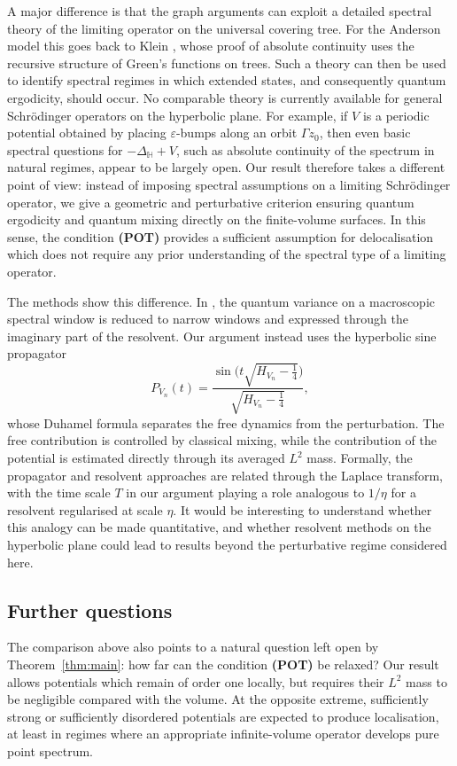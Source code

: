 \documentclass[11pt,twoside,reqno]{amsart}
\newcommand{\1}{\mathrm{\mathbf{1}}}
\numberwithin{equation}{section}
\theoremstyle{plain}
\theoremstyle{definition}
\theoremstyle{remark}
\begin{document}
A major difference is that the graph arguments can exploit a detailed spectral theory of the limiting operator on the universal covering tree. For the Anderson model this goes back to Klein \cite{Klein1998}, whose proof of absolute continuity uses the recursive structure of Green's functions on trees. Such a theory can then be used to identify spectral regimes in which extended states, and consequently quantum ergodicity, should occur. No comparable theory is currently available for general Schr\"odinger operators on the hyperbolic plane. For example, if $V$ is a periodic potential obtained by placing $\varepsilon$-bumps along an orbit $\Gamma z_0$, then even basic spectral questions for $-\Delta_{\mathbb H}+V$, such as absolute continuity of the spectrum in natural regimes, appear to be largely open. Our result therefore takes a different point of view: instead of imposing spectral assumptions on a limiting Schr\"odinger operator, we give a geometric and perturbative criterion ensuring quantum ergodicity and quantum mixing directly on the finite-volume surfaces. In this sense, the condition \textbf{(POT)} provides a sufficient assumption for delocalisation which does not require any prior understanding of the spectral type of a limiting operator.

The methods show this difference. In \cite{bordenave2026quantummixinglargeschreier}, the quantum variance on a macroscopic spectral window is reduced to narrow windows and expressed through the imaginary part of the resolvent. Our argument instead uses the hyperbolic sine propagator
\[
P_{V_n}(t)=\frac{\sin\big(t\sqrt{H_{V_n}-\tfrac14}\big)}{\sqrt{H_{V_n}-\tfrac14}},
\]
whose Duhamel formula separates the free dynamics from the perturbation. The free contribution is controlled by classical mixing, while the contribution of the potential is estimated directly through its averaged $L^2$ mass. Formally, the propagator and resolvent approaches are related through the Laplace transform, with the time scale $T$ in our argument playing a role analogous to $1/\eta$ for a resolvent regularised at scale $\eta$. It would be interesting to understand whether this analogy can be made quantitative, and whether resolvent methods on the hyperbolic plane could lead to results beyond the perturbative regime considered here.

\subsection{Further questions} The comparison above also points to a natural question left open by Theorem~\ref{thm:main}: how far can the condition \textbf{(POT)} be relaxed? Our result allows potentials which remain of order one locally, but requires their $L^2$ mass to be negligible compared with the volume. At the opposite extreme, sufficiently strong or sufficiently disordered potentials are expected to produce localisation, at least in regimes where an appropriate infinite-volume operator develops pure point spectrum. 
\end{document}
